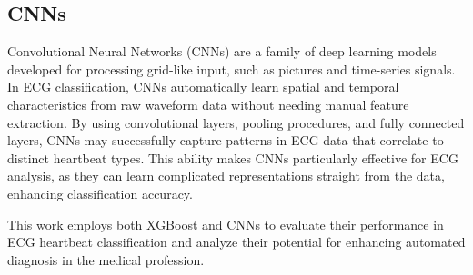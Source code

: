 \subsection{CNNs}
\indent \indent Convolutional Neural Networks (CNNs) are a family of deep learning models developed for processing grid-like input, such as pictures and time-series signals.  In ECG classification, CNNs automatically learn spatial and temporal characteristics from raw waveform data without needing manual feature extraction.  By using convolutional layers, pooling procedures, and fully connected layers, CNNs may successfully capture patterns in ECG data that correlate to distinct heartbeat types.  This ability makes CNNs particularly effective for ECG analysis, as they can learn complicated representations straight from the data, enhancing classification accuracy.

\indent This work employs both XGBoost and CNNs to evaluate their performance in ECG heartbeat classification and analyze their potential for enhancing automated diagnosis in the medical profession.

\clearpage

